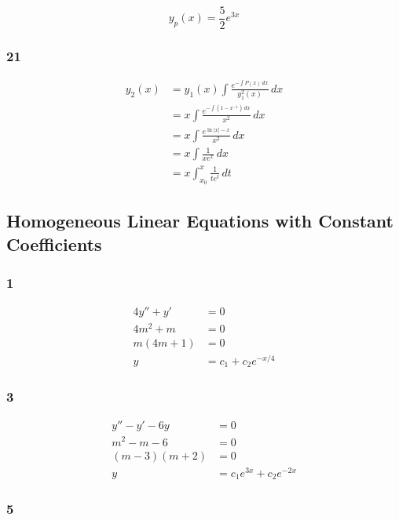 \documentclass{article}
\begin{document}
\[y_p(x) = \frac{5}{2} e^{3x}\]

\subsubsection{21}

\begin{align*}
  y_2(x) & = y_1(x) \int \frac{e^{-\int P(x) \,dx}}{y_1^2(x)} \,dx \\
         & = x \int \frac{e^{-\int (1 - x^{-1}) \,dx}}{x^2} \,dx   \\
         & = x \int \frac{e^{\ln |x| - x}}{x^2} \,dx               \\
         & = x \int \frac{1}{x e^x} \,dx                           \\
         & = x \int_{x_0}^x \frac{1}{t e^t} \,dt
\end{align*}

\subsection{Homogeneous Linear Equations with Constant Coefficients}

\subsubsection{1}

\begin{align*}
  4 y'' + y' & = 0                    \\
  4 m^2 + m  & = 0                    \\
  m (4m + 1) & = 0                    \\
  y          & = c_1 + c_2 e^{-x / 4}
\end{align*}

\subsubsection{3}

\begin{align*}
  y'' - y' - 6y   & = 0                        \\
  m^2 - m - 6     & = 0                        \\
  (m - 3) (m + 2) & = 0                        \\
  y               & = c_1 e^{3x} + c_2 e^{-2x}
\end{align*}

\subsubsection{5}
\end{document}
